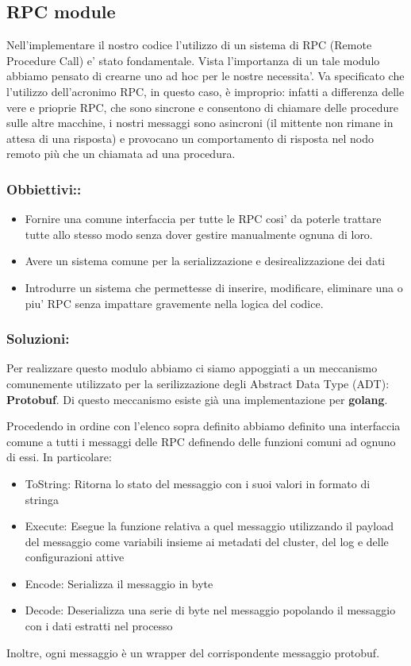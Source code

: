 \subsection{RPC module}
Nell'implementare il nostro codice l'utilizzo di un sistema di RPC (Remote Procedure Call) e' stato
fondamentale. Vista l'importanza di un tale modulo abbiamo pensato di crearne uno ad hoc per le 
nostre necessita'. Va specificato che l'utilizzo dell'acronimo RPC, in questo caso, è improprio: 
infatti a differenza delle vere e prioprie RPC, che sono sincrone e consentono di chiamare 
delle procedure sulle altre macchine, i nostri messaggi sono asincroni (il mittente non rimane 
in attesa di una risposta) e provocano un comportamento di risposta nel nodo remoto più che un 
chiamata ad una procedura.  
\subsubsection{Obbiettivi::\\}
\begin{itemize}
    \item Fornire una comune interfaccia per tutte le RPC cosi' da poterle trattare tutte 
        allo stesso modo senza dover gestire manualmente ognuna di loro.
    \item Avere un sistema comune per la serializzazione e desirealizzazione dei dati
    \item Introdurre un sistema che permettesse di inserire, modificare, eliminare una o piu' RPC
        senza impattare gravemente nella logica del codice.
\end{itemize}
\subsubsection{Soluzioni:\\}
Per realizzare questo modulo abbiamo ci siamo appoggiati a un meccanismo comunemente utilizzato 
per la serilizzazione degli Abstract Data Type (ADT): \textbf{Protobuf}.
Di questo meccanismo esiste già una implementazione per \textbf{golang}.

Procedendo in ordine con l'elenco sopra definito abbiamo definito una interfaccia comune
a tutti i messaggi delle RPC definendo delle funzioni comuni ad ognuno di essi. In particolare:
\begin{itemize}
  \item ToString: Ritorna lo stato del messaggio con i suoi valori in formato di stringa
  \item Execute: Esegue la funzione relativa a quel messaggio utilizzando il payload 
    del messaggio come variabili insieme ai metadati del cluster, del log e 
    delle configurazioni attive
  \item Encode: Serializza il messaggio in byte
  \item Decode: Deserializza una serie di byte nel messaggio popolando il messaggio 
     con i dati estratti nel processo
\end{itemize}
Inoltre, ogni messaggio è un wrapper del corrispondente messaggio protobuf. 

